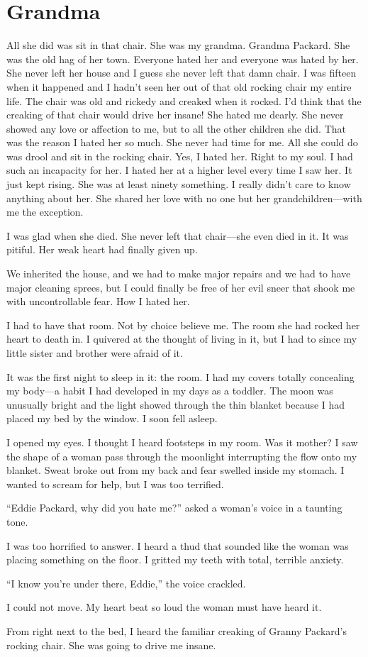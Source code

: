 \chapter{Grandma}

All she did was sit in that chair. She was my grandma. Grandma
Packard. She was the old hag of her town. Everyone hated her and
everyone was hated by her. She never left her house and I guess she
never left that damn chair. I was fifteen when it happened and I hadn't
seen her out of that old rocking chair my entire life. The chair was old
and rickedy and creaked when it rocked. I'd think that the creaking of
that chair would drive her insane! She hated me dearly. She never showed
any love or affection to me, but to all the other children she did. That
was the reason I hated her so much. She never had time for me. All she
could do was drool and sit in the rocking chair. Yes, I hated her. Right
to my soul. I had such an incapacity for her. I hated her at a higher
level every time I saw her. It just kept rising. She was at least ninety
something. I really didn't care to know anything about her. She shared
her love with no one but her grandchildren---with me the exception.

I was glad when she died. She never left that chair---she even died in
it. It was pitiful. Her weak heart had finally given up.

We inherited the house, and we had to make major repairs and we had to
have major cleaning sprees, but I could finally be free of her evil
sneer that shook me with uncontrollable fear. How I hated her.

I had to have that room. Not by choice believe me. The room she had
rocked her heart to death in. I quivered at the thought of living in it,
but I had to since my little sister and brother were afraid of it.

It was the first night to sleep in it: the room. I had my covers totally
concealing my body---a habit I had developed in my days as a toddler. The
moon was unusually bright and the light showed through the thin blanket
because I had placed my bed by the window. I soon fell asleep.

I opened my eyes. I thought I heard footsteps in my room. Was it mother?
I saw the shape of a woman pass through the moonlight interrupting the
flow onto my blanket. Sweat broke out from my back and fear swelled
inside my stomach. I wanted to scream for help, but I was too terrified.

``Eddie Packard, why did you hate me?'' asked a woman's voice in a
taunting tone.

I was too horrified to answer. I heard a thud that sounded like the
woman was placing something on the floor. I gritted my teeth with total,
terrible anxiety.

``I know you're under there, Eddie,'' the voice crackled.

I could not move. My heart beat so loud the woman must have heard it.

From right next to the bed, I heard the familiar creaking of Granny
Packard's rocking chair. She was going to drive me insane.
